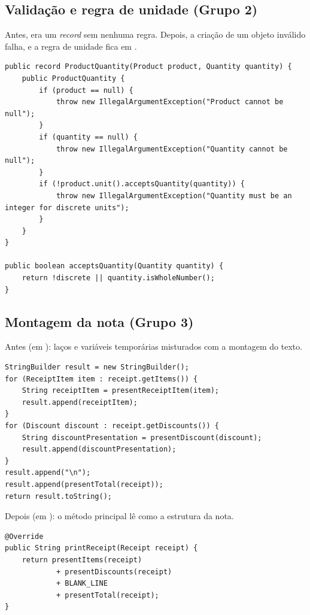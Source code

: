 \subsection{Validação e regra de unidade (Grupo 2)}
Antes,  era um \textit{record} sem nenhuma regra. Depois, a criação de um objeto inválido falha, e a regra de unidade fica em .
\begin{lstlisting}
public record ProductQuantity(Product product, Quantity quantity) {
    public ProductQuantity {
        if (product == null) {
            throw new IllegalArgumentException("Product cannot be null");
        }
        if (quantity == null) {
            throw new IllegalArgumentException("Quantity cannot be null");
        }
        if (!product.unit().acceptsQuantity(quantity)) {
            throw new IllegalArgumentException("Quantity must be an integer for discrete units");
        }
    }
}

public boolean acceptsQuantity(Quantity quantity) {
    return !discrete || quantity.isWholeNumber();
}
\end{lstlisting}

\subsection{Montagem da nota (Grupo 3)}
Antes (em ): laços e variáveis temporárias misturados com a montagem do texto.
\begin{lstlisting}
StringBuilder result = new StringBuilder();
for (ReceiptItem item : receipt.getItems()) {
    String receiptItem = presentReceiptItem(item);
    result.append(receiptItem);
}
for (Discount discount : receipt.getDiscounts()) {
    String discountPresentation = presentDiscount(discount);
    result.append(discountPresentation);
}
result.append("\n");
result.append(presentTotal(receipt));
return result.toString();
\end{lstlisting}
Depois (em ): o método principal lê como a estrutura da nota.
\begin{lstlisting}
@Override
public String printReceipt(Receipt receipt) {
    return presentItems(receipt)
            + presentDiscounts(receipt)
            + BLANK_LINE
            + presentTotal(receipt);
}
\end{lstlisting}

